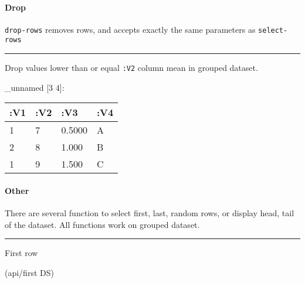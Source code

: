 \documentclass[]{article}
\newenvironment{Shaded}{\begin{snugshade}}{\end{snugshade}}
\newcommand{\KeywordTok}[1]{\textcolor[rgb]{0.13,0.29,0.53}{\textbf{#1}}}
\newcommand{\VariableTok}[1]{\textcolor[rgb]{0.00,0.00,0.00}{#1}}
\newcommand{\AttributeTok}[1]{\textcolor[rgb]{0.77,0.63,0.00}{#1}}
\newcommand{\NormalTok}[1]{#1}
\let\oldparagraph\paragraph
\renewcommand{\paragraph}[1]{\oldparagraph{#1}\mbox{}}
\begin{document}
\paragraph{Drop}\label{drop-1}

\texttt{drop-rows} removes rows, and accepts exactly the same parameters
as \texttt{select-rows}

\begin{center}\rule{0.5\linewidth}{0.5pt}\end{center}

Drop values lower than or equal \texttt{:V2} column mean in grouped
dataset.

\begin{Shaded}
\end{Shaded}

\_unnamed {[}3 4{]}:

\begin{longtable}[]{@{}llll@{}}
\toprule
:V1 & :V2 & :V3 & :V4\tabularnewline
\midrule
\endhead
1 & 7 & 0.5000 & A\tabularnewline
2 & 8 & 1.000 & B\tabularnewline
1 & 9 & 1.500 & C\tabularnewline
\bottomrule
\end{longtable}

\paragraph{Other}\label{other}

There are several function to select first, last, random rows, or
display head, tail of the dataset. All functions work on grouped
dataset.

\begin{center}\rule{0.5\linewidth}{0.5pt}\end{center}

First row

\begin{Shaded}
\begin{Highlighting}[]
\NormalTok{(api/first DS)}
\end{Highlighting}
\end{Shaded}
\end{document}
